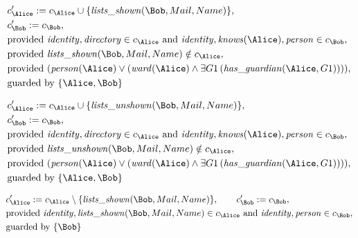 \begin{align*}
&
c'_
{
\Alice
}
 := 
c_
{
\Alice
}
 \cup 
\{
\mathit{\detokenize{
lists_shown
}}
(
\Bob
,
Mail
,
Name
)
\}
,\\
&
c'_
{
\Bob
}
 := 
c_
{
\Bob
}
,\\
&
\text{provided } 
\mathit{\detokenize{
identity
}}
,
\mathit{\detokenize{
directory
}}
 \in c_
{
\Alice
}
 \text{ and } 
\mathit{\detokenize{
identity
}}
,
\mathit{\detokenize{
knows
}}
(
\Alice
)
,
\mathit{\detokenize{
person
}}
 \in c_
{
\Bob
}
,\\
&
\text{provided } 
\mathit{\detokenize{
lists_shown
}}
(
\Bob
,
Mail
,
Name
)
 \notin c_
{
\Alice
}
,\\
&
\text{provided } 
(
\mathit{\detokenize{
person
}}
(
\Alice
)
\lor
(
\mathit{\detokenize{
ward
}}
(
\Alice
)
\land
\exists 
G1
\,(
\mathit{\detokenize{
has_guardian
}}
(
\Alice
,
G1
)
)
)
)
,\\
&
\text{guarded by } \{
\Alice
,
\Bob
\}
\end{align*}

\begin{align*}
&
c'_
{
\Alice
}
 := 
c_
{
\Alice
}
 \cup 
\{
\mathit{\detokenize{
lists_unshown
}}
(
\Bob
,
Mail
,
Name
)
\}
,\\
&
c'_
{
\Bob
}
 := 
c_
{
\Bob
}
,\\
&
\text{provided } 
\mathit{\detokenize{
identity
}}
,
\mathit{\detokenize{
directory
}}
 \in c_
{
\Alice
}
 \text{ and } 
\mathit{\detokenize{
identity
}}
,
\mathit{\detokenize{
knows
}}
(
\Alice
)
,
\mathit{\detokenize{
person
}}
 \in c_
{
\Bob
}
,\\
&
\text{provided } 
\mathit{\detokenize{
lists_unshown
}}
(
\Bob
,
Mail
,
Name
)
 \notin c_
{
\Alice
}
,\\
&
\text{provided } 
(
\mathit{\detokenize{
person
}}
(
\Alice
)
\lor
(
\mathit{\detokenize{
ward
}}
(
\Alice
)
\land
\exists 
G1
\,(
\mathit{\detokenize{
has_guardian
}}
(
\Alice
,
G1
)
)
)
)
,\\
&
\text{guarded by } \{
\Alice
,
\Bob
\}
\end{align*}

\begin{align*}
&
c'_
{
\Alice
}
 := 
c_
{
\Alice
}
 \setminus 
\{
\mathit{\detokenize{
lists_shown
}}
(
\Bob
,
Mail
,
Name
)
\}
, \qquad 
c'_
{
\Bob
}
 := 
c_
{
\Bob
}
,\\
&
\text{provided } 
\mathit{\detokenize{
identity
}}
,
\mathit{\detokenize{
lists_shown
}}
(
\Bob
,
Mail
,
Name
)
 \in c_
{
\Alice
}
 \text{ and } 
\mathit{\detokenize{
identity
}}
,
\mathit{\detokenize{
person
}}
 \in c_
{
\Bob
}
,\\
&
\text{guarded by } \{
\Bob
\}
\end{align*}
